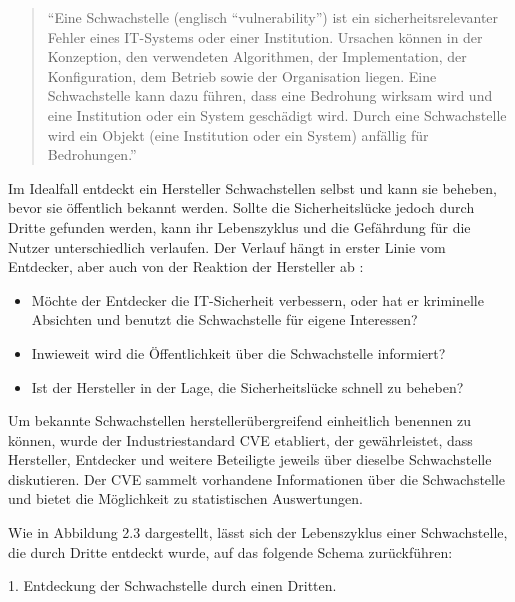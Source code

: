\documentclass[12pt,oneside,a4paper,parskip,pointlessnumbers]{scrbook}
\begin{document}
  \begin{quote}``Eine Schwachstelle (englisch ``vulnerability'') ist ein sicherheitsrelevanter Fehler eines IT-Systems oder einer Institution. Ursachen können in der Konzeption, den verwendeten Algorithmen, der Implementation, der Konfiguration, dem Betrieb sowie der Organisation liegen. Eine Schwachstelle kann dazu führen, dass eine Bedrohung wirksam wird und eine Institution oder ein System geschädigt wird. Durch eine Schwachstelle wird ein Objekt (eine Institution oder ein System) anfällig für Bedrohungen.'' \cite[S.107]{BSI2}
  \end{quote}

  Im Idealfall entdeckt ein Hersteller Schwachstellen selbst und kann sie beheben, bevor sie öffentlich bekannt werden. Sollte die Sicherheitslücke jedoch durch Dritte gefunden werden, kann ihr Lebenszyklus und die Gefährdung für die Nutzer unterschiedlich verlaufen. Der Verlauf hängt in erster Linie vom Entdecker, aber auch von der Reaktion der Hersteller ab \cite{BSI3}:
  \begin{itemize}
    \item Möchte der Entdecker die IT-Sicherheit verbessern, oder hat er kriminelle Absichten und benutzt die Schwachstelle für eigene Interessen?
    \item Inwieweit wird die Öffentlichkeit über die Schwachstelle informiert?
    \item Ist der Hersteller in der Lage, die Sicherheitslücke schnell zu beheben?
  \end{itemize}
Um bekannte Schwachstellen herstellerübergreifend einheitlich benennen zu können, wurde der Industriestandard \ac{CVE} etabliert, der gewährleistet, dass Hersteller, Entdecker und weitere Beteiligte jeweils über dieselbe Schwachstelle diskutieren. Der \ac{CVE} sammelt vorhandene Informationen über die Schwachstelle und bietet die Möglichkeit zu statistischen Auswertungen.

  Wie in Abbildung 2.3 dargestellt, lässt sich der Lebenszyklus einer Schwachstelle, die durch Dritte entdeckt wurde, auf das folgende Schema zurückführen\cite{BSI3}:

  1. Entdeckung der Schwachstelle durch einen Dritten.
\end{document}
